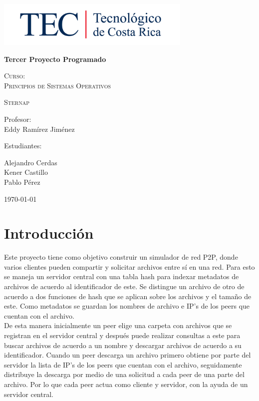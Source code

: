\documentclass{article}
\begin{document}
\begin{titlepage}
\centering
{\includegraphics[width=0.7\textwidth]{logoTEC}\par}
\vspace{1cm}
{\bfseries\Large Tercer Proyecto Programado \par}
\vspace{1cm}
{\scshape\Large Curso:\\
Principios de Sistemas Operativos \par}
\vspace{3cm}
{\scshape\Huge Sternap \par}
\vspace{2cm}
{\Large Profesor: \\
Eddy Ramírez Jiménez\\ \par}
\vfill

\vfill
{\Large Estudiantes: \par}
{ \Large Alejandro Cerdas\\
Kener Castillo\\
Pablo Pérez\par}

\vfill
{\Large \today \par}
\end{titlepage}

\section{Introducción}
Este proyecto tiene como objetivo construir un simulador de red P2P, donde varios clientes pueden compartir 
y solicitar archivos entre sí en una red. Para esto se maneja un servidor central con una tabla hash para indexar metadatos de archivos 
de acuerdo al identificador de este. Se distingue un archivo de otro de acuerdo a dos funciones de hash que se aplican sobre 
los archivos y el tamaño de este. Como metadatos se guardan los nombres de archivo e IP's de los peers que cuentan con el archivo. \\

De esta manera inicialmente un peer elige una carpeta con archivos que se registran en el servidor central y después puede realizar consultas 
a este para buscar archivos de acuerdo a un nombre y descargar archivos de acuerdo a su identificador. Cuando un peer descarga un archivo primero obtiene por parte 
del servidor la lista de IP's de los peers que cuentan con el archivo, seguidamente distribuye la descarga por medio de 
una solicitud a cada peer de una parte del archivo. Por lo que cada peer actua como cliente y servidor, con la ayuda de un servidor central.\\
\end{document}
